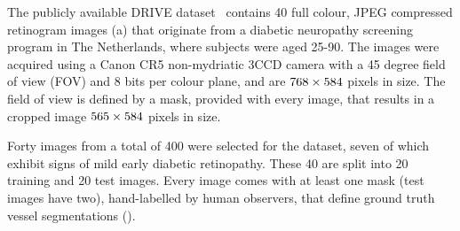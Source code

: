 \label{s:dataset_drive}
The publicly available DRIVE dataset~\cite{Staal_etal_TMI04} contains 40 full colour, JPEG compressed retinogram images (a) that originate from a diabetic neuropathy screening program in The Netherlands, where subjects were aged 25-90. The images were acquired using a Canon CR5 non-mydriatic 3CCD camera with a 45 degree field of view (FOV) and 8 bits per colour plane, and are $768 \times 584$ pixels in size. The field of view is defined by a mask, provided with every image, that results in a cropped image $565 \times 584$ pixels in size.

Forty images from a total of 400 were selected for the dataset, seven of which exhibit signs of mild early diabetic retinopathy. These 40 are split into 20 training and 20 test images. Every image comes with at least one mask (test images have two), hand-labelled by human observers, that define ground truth vessel segmentations ().



